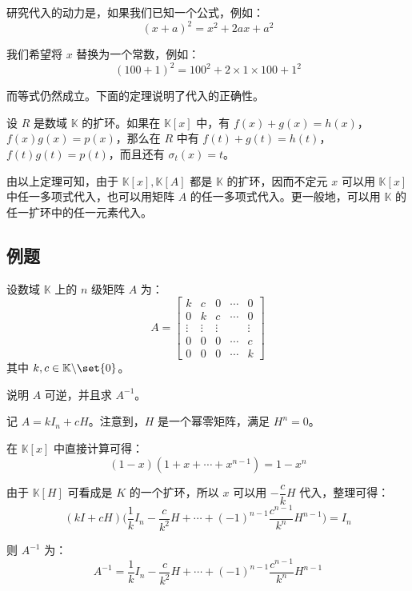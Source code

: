 研究代入的动力是，如果我们已知一个公式，例如：
$$
(x + a)^2 = x^2 + 2ax + a^2
$$

我们希望将 $x$ 替换为一个常数，例如：
$$
(100 + 1)^2 = 100^2 + 2 \times 1 \times 100 + 1^2
$$

而等式仍然成立。下面的定理说明了代入的正确性。

\begin{theorem}
	设 $R$ 是数域 $\mathbb K$ 的扩环。如果在 $\mathbb K[x]$ 中，有 $f(x) + g(x) = h(x)$，$f(x)g(x) = p(x)$，那么在 $R$ 中有 $f(t) + g(t) = h(t)$，$f(t) g(t) = p(t)$，而且还有 $\sigma_t(x) = t$。
\end{theorem}

由以上定理可知，由于 $\mathbb K[x], \mathbb K[A]$ 都是 $\mathbb K$ 的扩环，因而不定元 $x$ 可以用 $\mathbb K[x]$ 中任一多项式代入，也可以用矩阵 $A$ 的任一多项式代入。更一般地，可以用 $\mathbb K$ 的任一扩环中的任一元素代入。

\subsection{例题}

\begin{exercise}
	设数域 $\mathbb K$ 上的 $n$ 级矩阵 $A$ 为：
	$$
	A =
	\begin{bmatrix}
		k & c & 0 & \cdots & 0
		\\
		0 & k & c & \cdots & 0
		\\
		\vdots & \vdots & \vdots & & \vdots
		\\
		0 & 0 & 0 & \cdots & c
		\\
		0 & 0 & 0 & \cdots & k
	\end{bmatrix}
	$$
	其中 $k, c \in \mathbb K \backslash \set{0}$。

	说明 $A$ 可逆，并且求 $A^{-1}$。
\end{exercise}

\begin{solve}
	记 $A = k I_n + c H$。注意到，$H$ 是一个幂零矩阵，满足 $H^n = 0$。

	在 $\mathbb K[x]$ 中直接计算可得：
	$$
	(1 - x)(1 + x + \cdots+ x^{n - 1}) = 1 - x^n
	$$

	由于 $\mathbb K[H]$ 可看成是 $K$ 的一个扩环，所以 $x$ 可以用 $-\dfrac{c}{k} H$ 代入，整理可得：
	$$
	(kI + cH) \biggl( \dfrac{1}{k} I_n - \dfrac{c}{k^2} H + \cdots + (-1)^{n - 1} \dfrac{c^{n - 1}}{k^n} H^{n - 1} \biggr) = I_n
	$$

	则 $A^{-1}$ 为：
	$$
	A^{-1} = \dfrac{1}{k} I_n - \dfrac{c}{k^2} H + \cdots + (-1)^{n - 1} \dfrac{c^{n - 1}}{k^n} H^{n - 1}
	$$
\end{solve}

